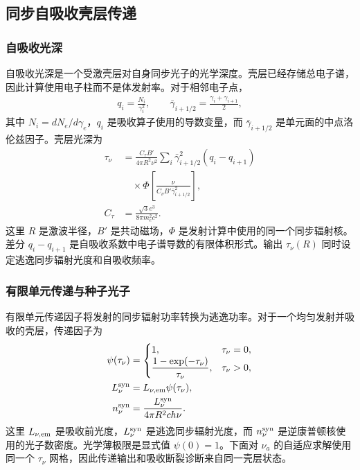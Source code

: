 \documentclass[twocolumn]{aastex702}
\begin{document}
\subsection{同步自吸收壳层传递}

\subsubsection{自吸收光深}

自吸收光深是一个受激壳层对自身同步光子的光学深度。壳层已经存储总电子谱，因此计算使用电子柱而不是体发射率。对于相邻电子点，
\begin{equation}
\begin{aligned}
q_i=\frac{N_i}{\gamma_i^2},\qquad
\bar\gamma_{i+1/2}=\frac{\gamma_i+\gamma_{i+1}}{2},
\end{aligned}
\end{equation}
其中 \(N_i=dN_e/d\gamma_e\)，\(q_i\) 是吸收算子使用的导数变量，而 \(\bar\gamma_{i+1/2}\) 是单元面的中点洛伦兹因子。壳层光深为
\begin{equation}
\begin{aligned}
\tau_\nu&=
\frac{C_\tau B'}{4\pi R^2\nu^2}
\sum_i
\bar\gamma_{i+1/2}^2
\left(q_i-q_{i+1}\right)\\
&\quad\times
\Phi\!\left[
\frac{\nu}{C_\nu B'\bar\gamma_{i+1/2}^2}
\right],\\
C_\tau&=\frac{\sqrt{3}e^3}{8\pi m_e^2 c^2}.
\end{aligned}
\end{equation}
这里 \(R\) 是激波半径，\(B'\) 是共动磁场，\(\Phi\) 是发射计算中使用的同一个同步辐射核。差分 \(q_i-q_{i+1}\) 是自吸收系数中电子谱导数的有限体积形式。输出 \(\tau_\nu(R)\) 同时设定逃逸同步辐射光度和自吸收频率。

\subsubsection{有限单元传递与种子光子}
\label{sec:syn-shell-transfer}

有限单元传递因子将发射的同步辐射功率转换为逃逸功率。对于一个均匀发射并吸收的壳层，传递因子为
\begin{equation}
\begin{aligned}
\psi(\tau_\nu)&=
\begin{cases}
1,&\tau_\nu=0,\\
\dfrac{1-\exp(-\tau_\nu)}{\tau_\nu},&\tau_\nu>0,
\end{cases}
\label{eq:finite-cell-transfer}\\
L_\nu^{\rm syn}&=L_{\nu,{\rm em}}\psi(\tau_\nu),\\
n_\nu^{\rm syn}&=\frac{L_\nu^{\rm syn}}{4\pi R^2 c h\nu}.
\end{aligned}
\end{equation}
这里 \(L_{\nu,{\rm em}}\) 是吸收前光度，\(L_\nu^{\rm syn}\) 是逃逸同步辐射光度，而 \(n_\nu^{\rm syn}\) 是逆康普顿核使用的光子数密度。光学薄极限是显式值 \(\psi(0)=1\)。下面对 \(\nu_a\) 的自适应求解使用同一个 \(\tau_\nu\) 网格，因此传递输出和吸收断裂诊断来自同一壳层状态。
\end{document}
